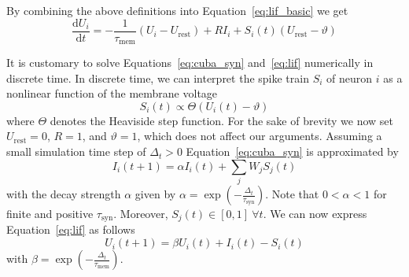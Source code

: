 \documentclass[journal,onecolumn,11pt]{IEEEtran}
\begin{document}
By combining the above definitions into Equation~\eqref{eq:lif_basic} we get 
\begin{equation}
    \frac{\mathrm{d}U_i}{\mathrm{d}t} = -\frac{1}{\tau_\mathrm{mem}}(U_i-U_\mathrm{rest}) + RI_i + S_i(t)(U_\mathrm{rest}-\vartheta)
    \label{eq:lif}
\end{equation}

It is customary to solve Equations~\eqref{eq:cuba_syn} and~\eqref{eq:lif}
numerically in discrete time.  In discrete time, we can interpret the spike
train $S_i$ of neuron $i$ as a nonlinear function of the membrane voltage
\begin{equation}
    S_i(t)\propto\Theta(U_i(t)-\vartheta)
    \label{eq:spike}
\end{equation}
where $\Theta$ denotes the Heaviside step function.  For the sake of brevity we
now set $U_\mathrm{rest}=0$, $R=1$, and $\vartheta=1$, which does not affect our
arguments.  Assuming a small simulation time step of $\Delta_t>0$
Equation~\eqref{eq:cuba_syn} is approximated by
\begin{equation}
    I_i(t+1) = \alpha I_i(t) + \sum_j W_j S_j(t)
    \label{eq:syn_discrete_time}
\end{equation}
with the decay strength $\alpha$ given by
$\alpha=\exp\left(-\frac{\Delta_t}{\tau_\mathrm{syn}} \right)$.  Note that
$0<\alpha<1$ for finite and positive $\tau_\mathrm{syn}$.  Moreover, $S_j(t) \in
[0,1]~ \forall t$.  We can now express Equation~\eqref{eq:lif} as follows 
\begin{equation}
    U_i(t+1) = \beta U_i(t) + I_i(t) -S_i(t)
    \label{eq:mem_discrete_time}
\end{equation}
with $\beta=\exp\left(-\frac{\Delta_t}{\tau_\mathrm{mem}}\right)$.
\end{document}
